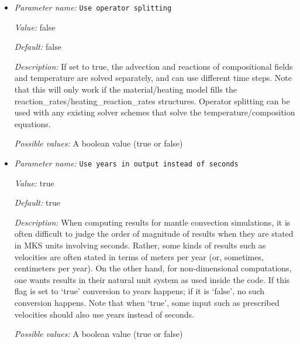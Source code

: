 \begin{itemize}
{\it Value:} true


{\it Default:} false


{\it Description:} If set to true the linear system for the Stokes equation will be solved using Trilinos klu, otherwise an iterative Schur complement solver is used. The direct solver is only efficient for small problems.


{\it Possible values:} A boolean value (true or false)
\item {\it Parameter name:} {\tt Use operator splitting}
\label{parameters:Use operator splitting}


{\it Value:} false


{\it Default:} false


{\it Description:} If set to true, the advection and reactions of compositional fields and temperature are solved separately, and can use different time steps. Note that this will only work if the material/heating model fills the reaction\_rates/heating\_reaction\_rates structures. Operator splitting can be used with any existing solver schemes that solve the temperature/composition equations.


{\it Possible values:} A boolean value (true or false)
\item {\it Parameter name:} {\tt Use years in output instead of seconds}
\label{parameters:Use years in output instead of seconds}


{\it Value:} true


{\it Default:} true


{\it Description:} When computing results for mantle convection simulations, it is often difficult to judge the order of magnitude of results when they are stated in MKS units involving seconds. Rather, some kinds of results such as velocities are often stated in terms of meters per year (or, sometimes, centimeters per year). On the other hand, for non-dimensional computations, one wants results in their natural unit system as used inside the code. If this flag is set to `true' conversion to years happens; if it is `false', no such conversion happens. Note that when `true', some input such as prescribed velocities should also use years instead of seconds.


{\it Possible values:} A boolean value (true or false)
\end{itemize}



